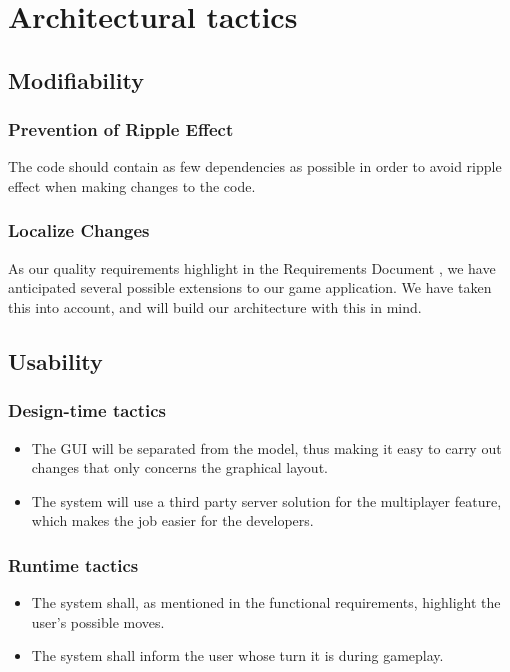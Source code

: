 \pagebreak

\section{Architectural tactics}

\subsection{Modifiability}                       

\subsubsection{Prevention of Ripple Effect}
The code should contain as few dependencies as possible in order to avoid ripple effect when making changes to the code.

\subsubsection{Localize Changes}
As our quality requirements highlight in the Requirements Document \cite{requirement}, we have anticipated several possible extensions to our game application. We have taken this into account, and will build our architecture with this in mind.

\subsection{Usability}

\subsubsection{Design-time tactics}
\begin{itemize}
\item The GUI will be separated from the model, thus making it easy to carry out changes that only concerns the graphical layout.
\item The system will use a third party server solution for the multiplayer feature, which makes the job easier for the developers.
\end{itemize}

\subsubsection{Runtime tactics}
\begin{itemize}
\item The system shall, as mentioned in the functional requirements, highlight the user's possible moves.
\item The system shall inform the user whose turn it is during gameplay. 
\end{itemize}

